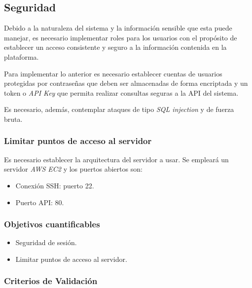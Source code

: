 \subsection{Seguridad}

Debido a la naturaleza del sistema y la información sensible que esta puede manejar, es necesario implementar roles para los usuarios con el propósito de establecer un acceso consistente y seguro a la información contenida en la plataforma. 

Para implementar lo anterior es necesario establecer cuentas de usuarios protegidas por contraseñas que deben ser almacenadas de forma encriptada y un token o \textit{API Key} que permita realizar consultas seguras a la API del sistema.

Es necesario, además, contemplar ataques de tipo \textit{SQL injection}  y de fuerza bruta.


\subsubsection{Limitar puntos de acceso al servidor}

Es necesario establecer la arquitectura del servidor a usar. Se empleará un servidor \textit{AWS EC2} y los puertos abiertos son: 
\begin{itemize}
	\item
	Conexión SSH: puerto 22.
	\item
	Puerto API: 80.
\end{itemize}

\subsubsection{Objetivos cuantificables}

\begin{itemize}
	\item
	Seguridad de sesión.
	\item
	Limitar puntos de acceso al servidor.
\end{itemize}

\subsubsection{Criterios de Validación}

